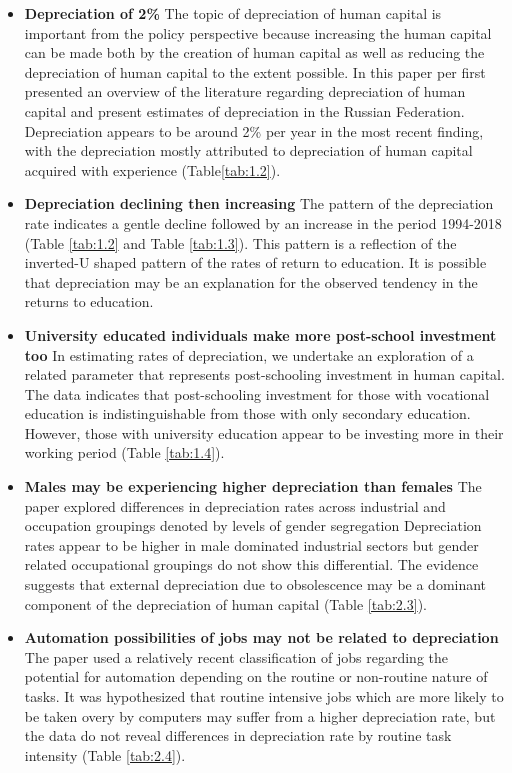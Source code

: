\documentclass[alpha-refs]{wiley-article-02b}
\begin{document}
\begin{itemize}
\item \textbf{Depreciation of 2\%} The topic of depreciation of human capital is important from the policy perspective because increasing the human capital can be made both by the creation of human capital as well as reducing the depreciation of human capital to the extent possible. In this paper per first presented an overview of the literature regarding depreciation of human capital and present estimates of depreciation in the Russian Federation. Depreciation appears to be around 2\% per year in the most recent finding, with the depreciation mostly attributed to depreciation of human capital acquired with experience (Table\ref{tab:1.2}).

\item \textbf{Depreciation declining then increasing}  The pattern of the depreciation rate indicates a gentle decline followed by an increase in the period 1994-2018 (Table \ref{tab:1.2} and Table \ref{tab:1.3}). This pattern is a reflection of the inverted-U shaped pattern of the rates of return to education. It is possible that depreciation may be an explanation for the observed tendency in the returns to education.

\item \textbf{University educated individuals make more post-school investment too} In estimating rates of depreciation, we undertake an exploration of a related parameter that represents post-schooling investment in human capital. The data indicates that post-schooling investment for those with vocational education is indistinguishable from those with only secondary education. However, those with university education appear to be investing more in their working period (Table \ref{tab:1.4}).

\item \textbf{Males may be experiencing higher depreciation than females} 
The paper explored differences in depreciation rates across industrial and 
occupation groupings denoted by levels of gender segregation Depreciation 
rates appear to be higher in male dominated industrial sectors but gender 
related occupational groupings do not show this differential. The evidence 
suggests that external depreciation due to obsolescence may be a dominant 
component of the depreciation of human capital (Table \ref{tab:2.3}). 

\item \textbf{Automation possibilities of jobs may not be related to depreciation} The paper used a relatively recent classification of jobs regarding the potential for automation depending on the routine or non-routine nature of tasks. It was hypothesized that routine intensive jobs which are more likely to be taken overy by computers may suffer from a higher depreciation rate, but the data do not reveal differences in depreciation rate by routine task intensity (Table \ref{tab:2.4}).

\end{itemize}
\end{document}
